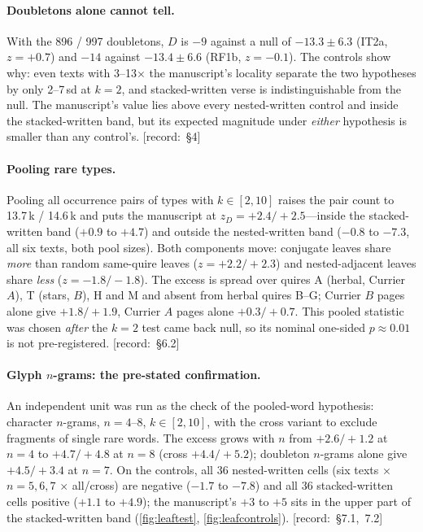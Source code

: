 \documentclass[11pt,a4paper]{article}
\newcommand{\src}[1]{{\footnotesize\color{muted}\sffamily\mbox{[record: \S#1]}}}
\newcommand{\Dstat}{D}
\newcommand{\IT}{\textcolor{it2a}{IT2a}}
\newcommand{\RF}{\textcolor{rf1b}{RF1b}}
\begin{document}
\paragraph{Doubletons alone cannot tell.} With the 896 / 997 doubletons, $\Dstat$ is $-9$ against a null of $-13.3\pm6.3$ (\IT, $z=+0.7$) and $-14$ against $-13.4\pm6.6$ (\RF, $z=-0.1$). The controls show why: even texts with 3--13$\times$ the manuscript's locality separate the two hypotheses by only 2--7\,sd at $k=2$, and stacked-written verse is indistinguishable from the null. The manuscript's value lies above every nested-written control and inside the stacked-written band, but its expected magnitude under \emph{either} hypothesis is smaller than any control's. \src{4}

\paragraph{Pooling rare types.} Pooling all occurrence pairs of types with $k\in[2,10]$ raises the pair count to 13.7\,k / 14.6\,k and puts the manuscript at $z_{\Dstat}=+2.4/+2.5$---inside the stacked-written band ($+0.9$ to $+4.7$) and outside the nested-written band ($-0.8$ to $-7.3$, all six texts, both pool sizes). Both components move: conjugate leaves share \emph{more} than random same-quire leaves ($z=+2.2/+2.3$) and nested-adjacent leaves share \emph{less} ($z=-1.8/-1.8$). The excess is spread over quires A (herbal, Currier $A$), T (stars, $B$), H and M and absent from herbal quires B--G; Currier $B$ pages alone give $+1.8/+1.9$, Currier $A$ pages alone $+0.3/+0.7$. This pooled statistic was chosen \emph{after} the $k=2$ test came back null, so its nominal one-sided $p\approx0.01$ is not pre-registered. \src{6.2}

\paragraph{Glyph $n$-grams: the pre-stated confirmation.} An independent unit was run as the check of the pooled-word hypothesis: character $n$-grams, $n=4$--8, $k\in[2,10]$, with the cross variant to exclude fragments of single rare words. The excess grows with $n$ from $+2.6/+1.2$ at $n=4$ to $+4.7/+4.8$ at $n=8$ (cross $+4.4/+5.2$); doubleton $n$-grams alone give $+4.5/+3.4$ at $n=7$. On the controls, all 36 nested-written cells (six texts $\times$ $n=5,6,7$ $\times$ all/cross) are negative ($-1.7$ to $-7.8$) and all 36 stacked-written cells positive ($+1.1$ to $+4.9$); the manuscript's $+3$ to $+5$ sits in the upper part of the stacked-written band (\cref{fig:leaftest}, \cref{fig:leafcontrols}). \src{7.1, 7.2}
\end{document}
